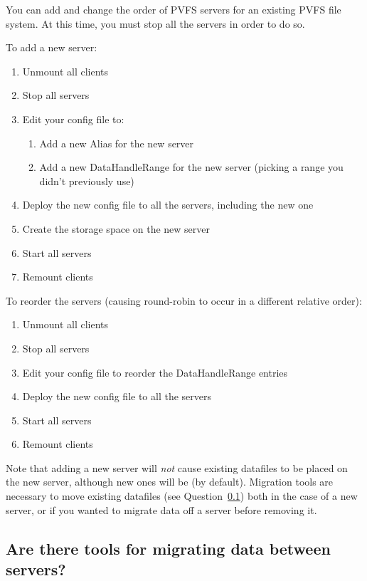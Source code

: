 \documentclass[11pt,letterpaper]{article}
\begin{document}
You can add and change the order of PVFS servers for an existing PVFS file
system.  At this time, you must stop all the servers in order to do so.

To add a new server:
\begin{enumerate}
\item Unmount all clients
\item Stop all servers
\item Edit your config file to:
  \begin{enumerate}
  \item Add a new Alias for the new server
  \item Add a new DataHandleRange for the new server (picking a range you
        didn't previously use)
  \end{enumerate}
\item Deploy the new config file to all the servers, including the new one
\item Create the storage space on the new server
\item Start all servers
\item Remount clients
\end{enumerate}

To reorder the servers (causing round-robin to occur in a different relative
order):
\begin{enumerate}
\item Unmount all clients
\item Stop all servers
\item Edit your config file to reorder the DataHandleRange entries
\item Deploy the new config file to all the servers
\item Start all servers
\item Remount clients
\end{enumerate}

Note that adding a new server will \emph{not} cause existing datafiles to be
placed on the new server, although new ones will be (by default).  Migration
tools are necessary to move existing datafiles (see
Question~\ref{sec:migration}) both in the case of a new server, or if you
wanted to migrate data off a server before removing it.

\subsection{Are there tools for migrating data between servers?}
\label{sec:migration}
\end{document}
